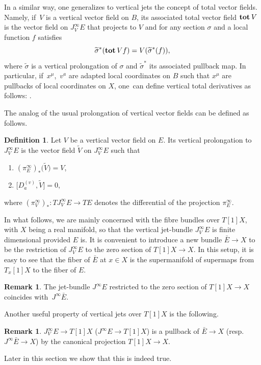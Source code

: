\documentclass[10pt,a4paper]{amsart}
\numberwithin{equation}{section}
\theoremstyle{definition}
\newtheorem{Definition}[Theorem]{Definition}
\newtheorem{Remark}[Theorem]{Remark}
\renewcommand{\tilde}{\widetilde}
\renewcommand{\d}{\partial}
\newcommand{\ffrac}[2]{\raisebox{.5pt}%
 {\footnotesize$\displaystyle\frac{#1}{#2}$}\kern1pt}
\newcommand{\dl}[1]{\mathchoice{\ffrac{\d}{\d #1}}{\frac{\d}{\d #1}}{\ffrac{\d}{\d #1}}{\ffrac{\d}{\d #1}}}
\newcommand{\total}{\textbf{tot\,}}
\newcommand{\vprol}{\tilde}
\begin{document}
In a similar way, one generalizes to vertical jets the concept of total vector fields. Namely, if~$V$ is a vertical vector field on $B$, its associated total vector field $\total{V}$ is the vector field on $J^{\infty}_VE$ that projects to $V$ and for any section $\sigma$ and a local function $f$ satisfies
\begin{equation*}
 \vprol{\sigma}^*(\total{V}f)=V (\vprol{\sigma}^* (f)),
\end{equation*}
where $\vprol{\sigma}$ is a vertical prolongation of $\sigma$ and $\vprol{\sigma}^*$ its associated pullback map. In particular, if~$x^\mu$,~$v^a$ are adapted local coordinates on $B$ such that $x^\mu$ are pullbacks of local coordinates on $X$, one~can define vertical total derivatives  as follows: \smash{$D^{(v)}_a=\total{\dl{v^a}}$}.

The analog of the usual prolongation of vertical vector fields can be defined as follows.

\begin{Definition}%
 Let $V$ be a vertical vector field on $E$. Its vertical prolongation to $J^{\infty}_VE$ is the vector field $\vprol{V}$ on $J^{\infty}_VE$ such that
 \begin{enumerate}\itemsep=0pt
 \item[(1)] $(\pi^{\infty}_E)_*\bigl(\vprol{V}\bigr)=V$,
 \item[(2)] $\bigl[D^{(v)}_a,\vprol{V}\bigr]=0$,
 \end{enumerate}
 where $(\pi^{\infty}_V)_*\colon TJ^{\infty}_VE\rightarrow TE$ denotes the differential of the projection $\pi^{\infty}_E$.
\end{Definition}

In what follows, we are mainly concerned with the fibre bundles over $T[1]X$, with $X$ being a real manifold, so that the vertical jet-bundle $J_V^\infty E$ is finite dimensional provided $E$ is. It is convenient to introduce a new bundle $\bar E \to X$ to be the restriction of $J^\infty_V E$ to the zero section of $T[1]X\to X$. In this setup, it is easy to see that the fiber of $\bar E$ at $x\in X$ is the supermanifold of supermaps from $T_x[1]X$ to the fiber of $E$.
\begin{Remark}
The jet-bundle $J^\infty E$ restricted to the zero section of $T[1]X\to X$ coincides with~${J^\infty \bar E}$.
\end{Remark}
Another useful property of vertical jets over $T[1]X$ is the following.

\begin{Remark}\label{rem:pullback}
$J_V^\infty E \to T[1]X$ ($J^\infty E\to T[1]X$) is a pullback of $\bar E \to X$ \big(resp.\ $J^\infty \bar E \to X$\big) by the canonical projection $T[1]X\to X$.
\end{Remark}
Later in this section we show that this is indeed true.
\end{document}
